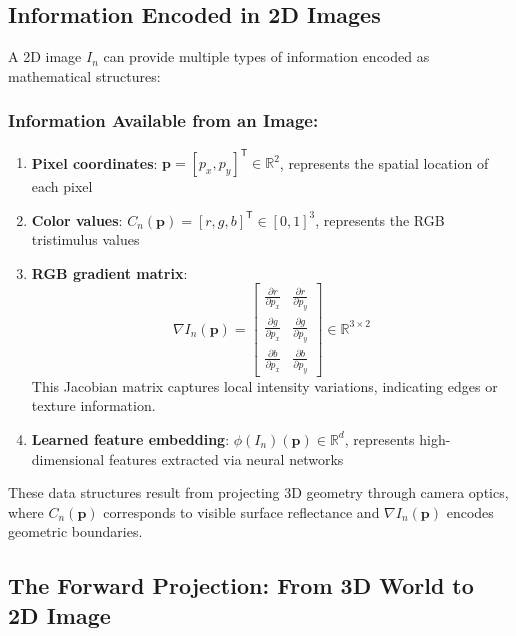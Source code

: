 \documentclass[12pt]{article}
\newcommand{\R}{\mathbb{R}}
\newcommand{\vect}[1]{\bm{#1}}
\theoremstyle{definition}
\begin{document}
\subsection{Information Encoded in 2D Images}

A 2D image $I_n$ can provide multiple types of information encoded as mathematical structures:

\subsubsection*{Information Available from an Image:}
\begin{enumerate}[label=(\roman*)]
    \item \textbf{Pixel coordinates}: $\vect{p} = [p_x, p_y]^\mathsf{T} \in \R^2$, represents the spatial location of each pixel
    
    \item \textbf{Color values}: $C_n(\vect{p}) = [r, g, b]^\mathsf{T} \in [0,1]^3$, represents the RGB tristimulus values
    
    \item \textbf{RGB gradient matrix}:
    \begin{equation}
        \nabla I_n(\vect{p}) = \begin{bmatrix}
            \frac{\partial r}{\partial p_x} & \frac{\partial r}{\partial p_y} \\[0.5em]
            \frac{\partial g}{\partial p_x} & \frac{\partial g}{\partial p_y} \\[0.5em]
            \frac{\partial b}{\partial p_x} & \frac{\partial b}{\partial p_y}
        \end{bmatrix} \in \R^{3 \times 2} \label{eq:gradient}
    \end{equation}
    This Jacobian matrix captures local intensity variations, indicating edges or texture information.
    
    \item \textbf{Learned feature embedding}: $\phi(I_n)(\vect{p}) \in \R^d$, represents high-dimensional features extracted via neural networks
\end{enumerate}

These data structures result from projecting 3D geometry through camera optics, where $C_n(\vect{p})$ corresponds to visible surface reflectance and $\nabla I_n(\vect{p})$ encodes geometric boundaries.

\newpage

\subsection{The Forward Projection: From 3D World to 2D Image}
\end{document}
